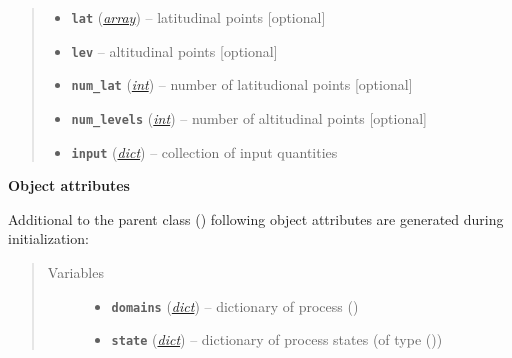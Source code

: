 \documentclass[a4paper,10pt,english]{sphinxmanual}
\begin{document}
\begin{fulllineitems}
\begin{quote}
\begin{description}
\begin{itemize}
\item {} 
\textbf{\texttt{lat}} (\href{http://docs.python.org/2.7/library/array.html\#module-array}{\emph{array}}) -- latitudinal points {[}optional{]}

\item {} 
\textbf{\texttt{lev}} -- altitudinal points {[}optional{]}

\item {} 
\textbf{\texttt{num\_lat}} (\href{http://docs.python.org/2.7/library/functions.html\#int}{\emph{int}}) -- number of latitudional points {[}optional{]}

\item {} 
\textbf{\texttt{num\_levels}} (\href{http://docs.python.org/2.7/library/functions.html\#int}{\emph{int}}) -- number of altitudinal points {[}optional{]}

\item {} 
\textbf{\texttt{input}} (\href{http://docs.python.org/2.7/library/stdtypes.html\#dict}{\emph{dict}}) -- collection of input quantities

\end{itemize}

\end{description}\end{quote}

\textbf{Object attributes}

Additional to the parent class {\hyperref[api/climlab.process:climlab.process.process.Process]{\emph{}}} ()
following object attributes are generated during initialization:
\begin{quote}\begin{description}
\item[{Variables}] \leavevmode\begin{itemize}
\item {} 
\textbf{\texttt{domains}} (\href{http://docs.python.org/2.7/library/stdtypes.html\#dict}{\emph{dict}}) -- dictionary of process {\hyperref[api/climlab.domain:climlab.domain.domain._Domain]{\emph{}}} ()

\item {} 
\textbf{\texttt{state}} (\href{http://docs.python.org/2.7/library/stdtypes.html\#dict}{\emph{dict}}) -- dictionary of process states 
(of type {\hyperref[api/climlab.domain:climlab.domain.field.Field]{\emph{}}} ())


\end{itemize}
\end{description}
\end{quote}
\end{fulllineitems}
\end{document}
